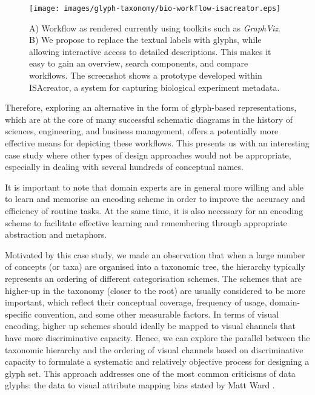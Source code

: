 \begin{figure}[ht!]
\centering
 \texttt{[image: images/glyph-taxonomy/bio-workflow-isacreator.eps]}
\caption{A) Workflow as rendered currently using toolkits such as \emph{GraphViz}.
B) We propose to replace the textual labels with glyphs, while allowing interactive access to detailed descriptions. This makes it easy to gain an overview, search components, and compare workflows. The screenshot shows a prototype developed within ISAcreator, a system for capturing biological experiment metadata.}
\label{fig:teaser}
\vspace{-5mm}
\end{figure}


Therefore, exploring an alternative in the form of glyph-based representations, which are at the core of many successful schematic diagrams in the history of sciences, engineering, and business management, offers a potentially more effective means for depicting these workflows.  
This presents us with an interesting case study where other types of design approaches would not be appropriate, especially in dealing with several hundreds of conceptual names.

It is important to note that domain experts are in general more willing and able to learn and memorise an encoding scheme in order to improve the accuracy and efficiency of routine tasks. At the same time, it is also necessary for an encoding scheme to facilitate effective learning and remembering through appropriate abstraction and metaphors.

Motivated by this case study, we made an observation that when a large number of concepts (or taxa) are organised into a taxonomic tree, the hierarchy typically represents an ordering of different categorisation schemes.
The schemes that are higher-up in the taxonomy (closer to the root) are usually considered to be more important, which reflect their conceptual coverage, frequency of usage, domain-specific convention, and some other measurable factors.
In terms of visual encoding, higher up schemes should ideally be mapped to visual channels that have more discriminative capacity.
Hence, we can explore the parallel between the taxonomic hierarchy and the ordering of visual channels based on discriminative capacity to formulate a systematic and relatively objective process for designing a glyph set.
This approach addresses one of the most common criticisms of data glyphs: the data to visual attribute mapping bias stated by Matt Ward \cite{ward08}.


